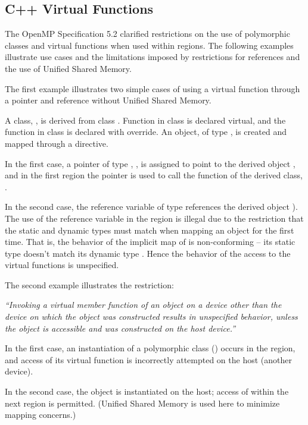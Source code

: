 \begin{cppspecific}[4ex]
\section{C++ Virtual Functions}
\label{sec:virtual_functions}


The OpenMP Specification 5.2 clarified restrictions on the use
of polymorphic classes and virtual functions when used within 
 regions. The following examples illustrate 
use cases and the limitations imposed by restrictions for
references and the use of Unified Shared Memory. 

The first example illustrates two simple cases of using a virtual function
through a pointer and reference without Unified Shared Memory. 

A class, , is derived from class .  
Function  in class  is declared
virtual, and the function  in class  is declared with override.
An object,  of type , is created and mapped through a 
directive.

In the first case, a pointer of type , , is assigned to point 
to the derived object , and in the first  region the pointer
is used to call the  function of the derived class, .

In the second case, the reference variable  of type  references 
the derived object ).  The use of the reference variable  
in the  region is illegal due to the restriction that the static and dynamic 
types must match when mapping an object for the first time.
That is, the behavior of the implicit map of  
is non-conforming -- its static type  doesn't match its dynamic type .  
Hence the behavior of the access to the virtual functions is unspecified.


The second example illustrates the restriction:

\emph{``Invoking a virtual member function of an object on a device other than the device on which the
object was constructed results in unspecified behavior, unless the object is accessible and was
constructed on the host device.''}

In the first case, an instantiation  of a polymorphic class () occurs in the 
 region, and access of its virtual function
is incorrectly attempted on the host (another device).

In the second case, the object  is instantiated on the host; access of  within
the next  region is permitted. (Unified Shared Memory is
used here to minimize mapping concerns.)

\end{cppspecific}
